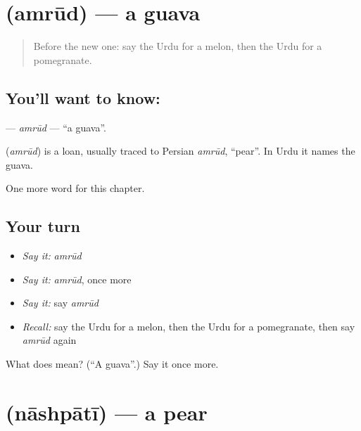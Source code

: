 \section[\texorpdfstring{\ur{امرود} (amrūd)}{امرود (amrūd)}]{ (amrūd) — a guava}

\label{lesson:UR-C116-amrud}



\begin{quote}
Before the new one: say the Urdu for a melon, then the Urdu for a pomegranate.
\end{quote}

\subsection*{You'll want to know: }
\textbf{} — \emph{amrūd} — \textquotedblleft{}a guava\textquotedblright{}.

\begin{cousinweb}
\textbf{} (\emph{amrūd}) is a loan, usually traced to Persian \emph{amrūd}, \textquotedblleft{}pear\textquotedblright{}. In Urdu it names the guava.
\end{cousinweb}

\begin{grammarlens}[title={What you've built}]
One more word for this chapter.
\end{grammarlens}

\subsection*{Your turn}
\begin{itemize}
\raggedright
  \item \emph{Say it:} \emph{amrūd}
  \item \emph{Say it:} \emph{amrūd}, once more
  \item \emph{Say it:} say \emph{amrūd}
  \item \emph{Recall:} say the Urdu for a melon, then the Urdu for a pomegranate, then say \emph{amrūd} again
\end{itemize}

\begin{tcolorbox}[breakable,colback=teal!4,colframe=teal!35!black,title={Before you move on}]
What does  mean? (\textquotedblleft{}A guava\textquotedblright{}.) Say it once more.
\end{tcolorbox}
\section[\texorpdfstring{\ur{ناشپاتی} (nāshpātī)}{ناشپاتی (nāshpātī)}]{ (nāshpātī) — a pear}

